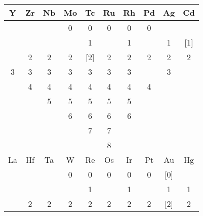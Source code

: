 \documentclass{article}
\begin{document}
{\begin{table}[H]
{\begin{tabular}{*{10}{c}}
	Y
	& Zr
	& Nb	
	& Mo	
	& Tc	
	& Ru	
	& Rh	
	& Pd	
	& Ag	
	& Cd
	
	\\ \midrule
	
	& 
	& 	
	& 0
	& 0	
	& 0	
	& 0	
	& 0	
	& 
	&
	
	\\
	
	& 
	& 
	& 
	& 1	
	& 
	& 1	
	& 
	& {\color{Emph}1} 
	& [1]
	
	\\
	
	& 2
	& 2
	& 2	
	& [2]		
	& 2
	& 2	
	& {\color{Emph}2}		
	& 2	 
	& {\color{Emph}2}
	
	\\
	
	{\color{Emph}3}
	& 3
	& 3	
	& 3		
	& 3	
	& {\color{Emph}3}	
	& {\color{Emph}3}		
	& 	 
	& 3
	&
	
	\\
	
	
	& {\color{Emph}4}
	& 4	
	& 4
	& {\color{Emph}4}
	& 4		
	& 4	 
	& 4
	&
	&
	
	\\
	
	
	& 
	& {\color{Emph}5}
	& 5	
	& 5
	& 5
	& 5		
	& 	 
	& 
	&
	
	\\
	
	& 
	& 
	& {\color{Emph}6}	
	& 6
	& 6
	& 6	
	& 	 
	& 
	&
	
	\\
	
	& 
	& 
	& 	
	& {\color{Emph}7}
	& 7
	& 		
	& 	 
	& 
	&
	
	\\
	
	& 
	& 
	& 	
	& 
	& 8
	& 		
	& 	 
	& 
	&
	
	\\ \midrule
	
	La
	& Hf
	& Ta	
	& W	
	& Re	
	& Os
	& Ir	
	& Pt	
	& Au	
	& Hg
	
	\\ \midrule
	
	& 
	& 	
	& 0
	& 0	
	& 0	
	& 0	
	& 0	
	& [0]
	&
	
	\\
	
	& 
	& 
	& 
	& 1	
	& 
	& 1	
	& 
	& 1 
	& {\color{Emph}1} 
	
	\\
	
	& 2
	& 2
	& 2	
	& 2		
	& 2
	& 2	
	& {\color{Emph}2}		
	& [2]
	& {\color{Emph}2}
	

\end{tabular}}
\end{table}}
\end{document}
